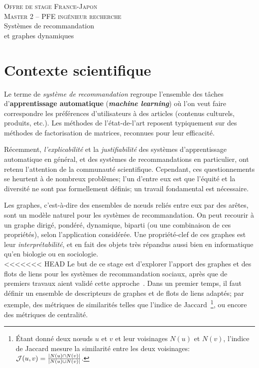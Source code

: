 \documentclass[a4paper, 12pt]{article}
\newcommand{\dest}{ 
    \textsc{\Large Offre de stage France-Japon\\ 
    Master 2 -- PFE ingénieur recherche}\\[1ex]
    {\Huge Systèmes de recommandation \\
    et graphes dynamiques}
  }
\begin{document}
\pagestyle{fancy} 

\addvspace{1cm}
\begin{center}
  \dest
\end{center}

\addvspace{1cm}

\section*{Contexte scientifique}

Le terme de {\em système de recommandation} regroupe l'ensemble des tâches d'{\bf apprentissage automatique} ({\bf {\em machine learning}}) où l'on veut faire correspondre les préférences d'utilisateurs à des articles (contenus culturels, produits, etc.). Les méthodes de l'état-de-l'art reposent typiquement sur des méthodes de factorisation de matrices, reconnues pour leur efficacité.

Récemment, {\em l'explicabilité} et la {\em justifiabilité} des systèmes d'apprentissage automatique en général, et des systèmes de recommandations en particulier, ont retenu l'attention de la communauté scientifique.
Cependant, ces questionnements se heurtent à de nombreux problèmes; l'un d'entre eux est que l'équité et la diversité ne sont pas formellement définis; un travail fondamental est nécessaire.

Les graphes, c'est-à-dire des ensembles de n\oe{}uds reliés entre eux par des arêtes, sont un modèle naturel pour les systèmes de recommandation.
On peut recourir à un graphe dirigé, pondéré, dynamique, biparti (ou une combinaison de ces propriétés), selon l'application considérée.
Une propriété-clef de ces graphes est leur {\em interprétabilité}, et en fait des objets très répandus aussi bien en informatique qu'en biologie ou en sociologie.\\

<<<<<<< HEAD
Le but de ce stage est d'explorer l'apport des graphes et des flots de liens pour les systèmes de recommandation sociaux, après que de premiers travaux aient validé cette approche~\cite{viard2018augmenting}.
Dans un premier temps, il faut définir un ensemble de descripteurs de graphes et de flots de liens adaptés; par exemple, des métriques de similarités telles que l'indice de Jaccard~\footnote{Étant donné deux n\oe{}uds $u$ et $v$ et leur voisinages $N(u)$ et $N(v)$, l'indice de Jaccard mesure la similarité entre les deux voisinages: ${\cal J}(u,v) = \frac{|N(u)\cap N(v)|}{|N(u) \cup N(v)|}$.}, ou encore des métriques de centralité.
\end{document}

